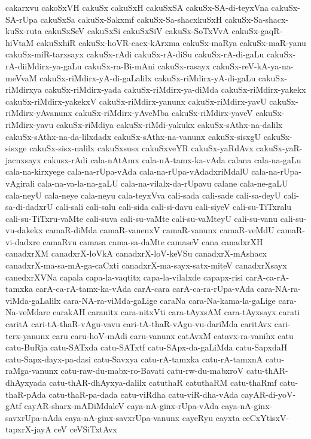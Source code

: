 {cakarxvu
cakoSxVH
cakuSx
cakuSxH
cakuSxSA
cakuSx-SA-di-teyxVna
cakuSx-SA-rUpa
cakuSxSa
cakuSx-Sakxmf
cakuSx-Sa-shacxkuSxH
cakuSx-Sa-shacx-kuSx-ruta
cakuSxSeV
cakuSxSi
cakuSxSiV
cakuSx-SoTxVvA
cakuSx-gaqR-hiVtaM
cakuSxhiR
cakuSx-hoVR-cacx-kArxma
cakuSx-maRya
cakuSx-maR-yanu
cakuSx-miR-tarxsayx
cakuSx-rAdi
cakuSx-rA-diSu
cakuSx-rA-di-gaLu
cakuSx-rA-diiMdirx-ya-gaLu
cakuSx-ra-Bi-mAni
cakuSx-rasayx
cakuSx-reV-kA-ya-na-meVvaM
cakuSx-riMdirx-yA-di-gaLalilx
cakuSx-riMdirx-yA-di-gaLu
cakuSx-riMdirxya
cakuSx-riMdirx-yada
cakuSx-riMdirx-ya-diMda
cakuSx-riMdirx-yakekx
cakuSx-riMdirx-yakekxV
cakuSx-riMdirx-yanunx
cakuSx-riMdirx-yavU
cakuSx-riMdirx-yAvanunx
cakuSx-riMdirx-yAveMba
cakuSx-riMdirx-yaveV
cakuSx-riMdirx-yavu
cakuSx-riMdiya
cakuSx-riMdi-yakukx
cakuSx-sAthx-na-dalilx
cakuSx-sAthx-na-da-lilxdadx
cakuSx-sAthx-na-vanunx
cakuSx-sisxgU
cakuSx-sisxge
cakuSx-sisx-nalilx
cakuSxsusx
cakuSxveYR
cakuSx-yaRdAvx
cakuSx-yaR-jacnxsayx
cakusx-rAdi
cala-nAtAmx
cala-nA-tamx-ka-vAda
calana
cala-na-gaLu
cala-na-kirxyege
cala-na-rUpa-vAda
cala-na-rUpa-vAdadxriMdalU
cala-na-rUpa-vAgirali
cala-na-va-la-na-gaLU
cala-na-vilalx-da-rUpavu
calane
cala-ne-gaLU
cala-neyU
cala-neye
cala-neyu
cala-teyxVva
cali-sada
cali-sade
cali-sa-deyU
cali-sa-di-dadxrU
cali-sali
cali-salu
cali-sida
cali-si-davu
cali-siyeV
cali-su-TiTxralu
cali-su-TiTxru-vaMte
cali-suva
cali-su-vaMte
cali-su-vaMteyU
cali-su-vanu
cali-su-vu-dakekx
camaR-diMda
camaR-vanenxV
camaR-vanunx
camaR-veMdU
camaR-vi-dadxre
camaRvu
camasa
cama-sa-daMte
camaseV
cana
canadxrXH
canadxrXM
canadxrX-loVkA
canadxrX-loV-keVSu
canadxrX-mAshacx
canadxrX-ma-sa-mA-ga-caCxti
canadxrX-ma-sayx-satx-miteV
canadxrXsayx
canedxrXVNa
capala
capa-la-vaqtitx
capa-la-vilalxde
capapx-risi
carA-ca-rA-tamxka
carA-ca-rA-tamx-ka-vAda
carA-cara
carA-ca-ra-rUpa-vAda
cara-NA-ra-viMda-gaLalilx
cara-NA-ra-viMda-gaLige
caraNa
cara-Na-kama-la-gaLige
cara-Na-veMdare
carakAH
caranitx
cara-nitxVti
cara-tAyxsAM
cara-tAyxsayx
carati
caritA
cari-tA-thaR-vAgu-vavu
cari-tA-thaR-vAgu-vu-dariMda
caritAvx
cari-terx-yanunx
caru
caru-hoV-mAdi
caru-vanunx
catAvxM
catavx-ra-vanihx
catu
catu-BuRja
catu-SATxda
catu-SATxtf
catu-SApx-da-gaLiMda
catu-SapxdaH
catu-Sapx-dayx-pa-dasi
catu-Savxya
catu-rA-tamxka
catu-rA-tamxnA
catu-raMga-vanunx
catu-raw-du-mabx-ro-Bavati
catu-rw-du-mabxroV
catu-thAR-dhAyxyada
catu-thAR-dhAyxya-dalilx
catuthaR
catuthaRM
catu-thaRmf
catu-thaR-pAda
catu-thaR-pa-dada
catu-viRdha
catu-viR-dha-vAda
cayAR-di-yoV-gAtf
cayAR-sharx-mADiMdaleV
caya-nA-ginx-rUpa-vAda
caya-nA-ginx-savxrUpa-nAda
caya-nA-ginx-savxrUpa-vanunx
cayeRyu
cayxta
ceCxYtisxV-tapxrX-jayA
ceV
ceVSiTxtAvx
}
